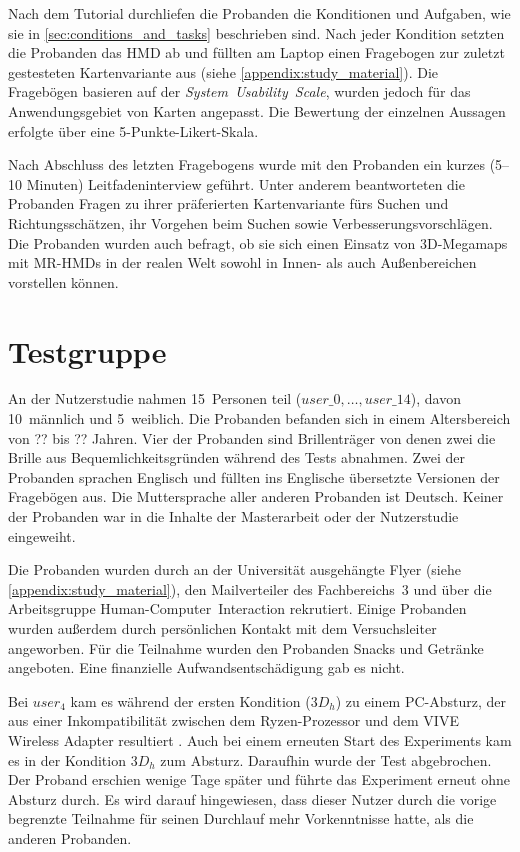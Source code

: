 Nach dem Tutorial durchliefen die Probanden die Konditionen und Aufgaben, wie sie in \autoref{sec:conditions_and_tasks} beschrieben sind.
Nach jeder Kondition setzten die Probanden das HMD ab und füllten am Laptop einen Fragebogen zur zuletzt gestesteten Kartenvariante aus (siehe \autoref{appendix:study_material}).
Die Fragebögen basieren auf der \emph{System~Usability~Scale}, wurden jedoch für das Anwendungsgebiet von Karten angepasst.
Die Bewertung der einzelnen Aussagen erfolgte über eine 5-Punkte-Likert-Skala.

Nach Abschluss des letzten Fragebogens wurde mit den Probanden ein kurzes (5--10 Minuten) Leitfadeninterview geführt.
Unter anderem beantworteten die Probanden Fragen zu ihrer präferierten Kartenvariante fürs Suchen und Richtungsschätzen, ihr Vorgehen beim Suchen sowie Verbesserungsvorschlägen.
Die Probanden wurden auch befragt, ob sie sich einen Einsatz von 3D-Megamaps mit MR-HMDs in der realen Welt sowohl in Innen- als auch Außenbereichen vorstellen können.

\section{Testgruppe}
An der Nutzerstudie nahmen 15~Personen teil ($user\_0, \dots, user\_14$), davon 10~männlich und 5~weiblich.
Die Probanden befanden sich in einem Altersbereich von ?? bis ?? Jahren.
Vier der Probanden sind Brillenträger von denen zwei die Brille aus Bequemlichkeitsgründen während des Tests abnahmen.
Zwei der Probanden sprachen Englisch und füllten ins Englische übersetzte Versionen der Fragebögen aus.
Die Muttersprache aller anderen Probanden ist Deutsch.
Keiner der Probanden war in die Inhalte der Masterarbeit oder der Nutzerstudie eingeweiht.

Die Probanden wurden durch an der Universität ausgehängte Flyer (siehe \autoref{appendix:study_material}), den Mailverteiler des Fachbereichs~3 und über die Arbeitsgruppe Human-Computer~Interaction rekrutiert.
Einige Probanden wurden außerdem durch persönlichen Kontakt mit dem Versuchsleiter angeworben.
Für die Teilnahme wurden den Probanden Snacks und Getränke angeboten.
Eine finanzielle Aufwandsentschädigung gab es nicht.

Bei $user_4$ kam es während der ersten Kondition ($3D_h$) zu einem PC-Absturz, der aus einer Inkompatibilität zwischen dem Ryzen-Prozessor und dem VIVE Wireless Adapter resultiert \parencite{HTCCorporation2018c}.
Auch bei einem erneuten Start des Experiments kam es in der Kondition $3D_h$ zum Absturz.
Daraufhin wurde der Test abgebrochen.
Der Proband erschien wenige Tage später und führte das Experiment erneut ohne Absturz durch.
Es wird darauf hingewiesen, dass dieser Nutzer durch die vorige begrenzte Teilnahme für seinen Durchlauf mehr Vorkenntnisse hatte, als die anderen Probanden.

